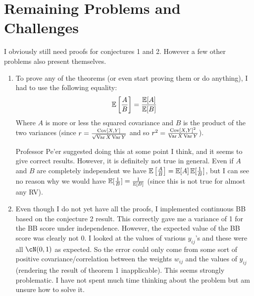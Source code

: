 \documentclass[11pt]{hw-template}
\begin{document}
\section*{Remaining Problems and Challenges}

  I obviously still need proofs for conjectures 1 and 2. However a few other problems also present themselves.

  \begin{enumerate}[label=(\arabic*)]
     \item To prove any of the theorems (or even start proving them or do anything), I had to use the following equality:
     $$\operatorname{\mathbb{E}}\left[\frac{A}{B}\right] = \frac{\operatorname{\mathbb{E}}[A]}{\operatorname{\mathbb{E}}[B]}$$
     Where $A$ is more or less the squared covariance and $B$ is the product of the two variances (since $r = \frac{\operatorname{Cov}[X, Y]}{\sqrt{\operatorname{Var}{X}\operatorname{Var}{Y}}}$ and so $r^2 = \frac{\operatorname{Cov}[X, Y]^2}{\operatorname{Var}{X}\operatorname{Var}{Y}}$).
     
     Professor Pe'er suggested doing this at some point I think, and it seems to give correct results. However, it is definitely not true in general. Even if $A$ and $B$ are completely independent we have
     $\operatorname{\mathbb{E}}\left[\frac{A}{B}\right] = \operatorname{\mathbb{E}}[A]\operatorname{\mathbb{E}}[\frac{1}{B}]$, but I can see no reason why we would have $\operatorname{\mathbb{E}}[\frac{1}{B}] = \frac{1}{\operatorname{\mathbb{E}}[B]}$ (since this is not true for almost any RV).
     
     \item Even though I do not yet have all the proofs, I implemented continuous BB based on the conjecture 2 result. This correctly gave me a variance of 1 for the BB score under independence. However,
     the expected value of the BB score was clearly not 0. I looked at the values of various $y_{ij}$'s and these were all $\cN(0, 1)$ as expected. So the error could only come from some sort of positive
     covariance/correlation between the weights $w_{ij}$ and the values of $y_{ij}$ (rendering the result of theorem 1 inapplicable). This seems strongly problematic. 
     I have not spent much time thinking about the problem but am unsure how to solve it.
  \end{enumerate}
\end{document}
